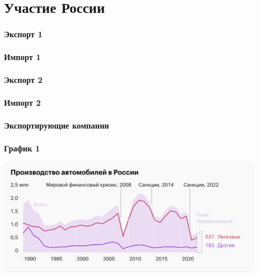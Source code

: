 \section{Участие России}

\begin{frame}
    \frametitle{Экспорт 1}
    \begin{center}
        
    \end{center}
\end{frame}

\begin{frame}
    \frametitle{Импорт 1}
    \begin{center}
        
    \end{center}
\end{frame}

\begin{frame}
    \frametitle{Экспорт 2}
    \begin{center}
        
    \end{center}
\end{frame}

\begin{frame}
    \frametitle{Импорт 2}
    \begin{center}
        
    \end{center}
\end{frame}

\begin{frame}
    \frametitle{Экспортирующие компании}
    \begin{center}
        
    \end{center}
\end{frame}

\begin{frame}
    \frametitle{График 1}
    \begin{center}
        \centering
        \includegraphics[width=1\linewidth]{Media/Images/plot-1.png}
    \end{center}
\end{frame}

